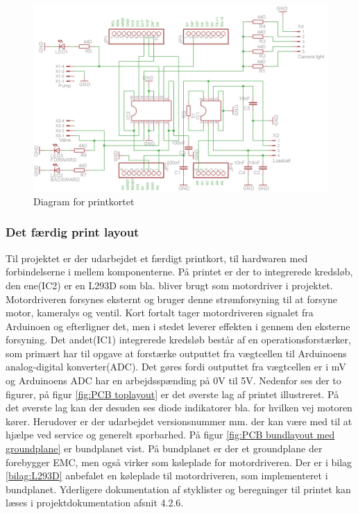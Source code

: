 \begin{figure}[H]
	\centering
	\includegraphics[width=1\textwidth]{billeder/Hovedrapport/Diagram.png}
	\caption{Diagram for printkortet}
	\label{fig:PCBdiagram}
\end{figure}

\newpage

\subsubsection{Det færdig print layout}
Til projektet er der udarbejdet et færdigt printkort, til hardwaren med forbindelserne i mellem komponenterne. På printet er der to integrerede kredsløb, den ene(IC2) er en L293D som bla. bliver brugt som motordriver i projektet. Motordriveren forsynes eksternt og bruger denne strømforsyning til at forsyne motor, kameralys og ventil. Kort fortalt tager motordriveren signalet fra Arduinoen og efterligner det, men i stedet leverer effekten i gennem den eksterne forsyning. Det andet(IC1) integrerede kredsløb består af en operationsforstærker, som primært har til opgave at forstærke outputtet fra vægtcellen til Arduinoens analog-digital konverter(ADC). Det gøres fordi outputtet fra vægtcellen er i mV og Arduinoens ADC har en arbejdsspænding på 0V til 5V. Nedenfor ses der to figurer, på figur \ref{fig:PCB toplayout} er det øverste lag af printet illustreret. På det øverste lag kan der desuden ses diode indikatorer bla. for hvilken vej motoren kører. Herudover er der udarbejdet versionsnummer mm. der kan være med til at hjælpe ved service og generelt sporbarhed. På figur \ref{fig:PCB bundlayout med groundplane} er bundplanet vist. På bundplanet er der et groundplane der forebygger EMC, men også virker som køleplade for motordriveren. Der er i bilag \ref{bilag:L293D} anbefalet en køleplade til motordriveren, som implementeret i bundplanet. Yderligere dokumentation af styklister og beregninger til printet kan læses i projektdokumentation afsnit 4.2.6. 

